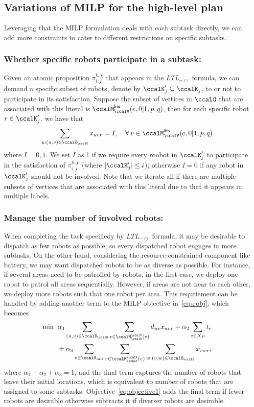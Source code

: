 \documentclass[Afour,sageh,times]{sagej}
\newcommand{\ltl}{ {\it LTL}$_{-\bigcirc}$ }
\renewcommand{\ap}[3]{\mathcal{\pi}_{{#1},{#2}}^{#3}}
\begin{document}
{{\subsection{Variations of MILP for the high-level plan}\label{sec:extension_milp}
Leveraging that the MILP formulation deals with each subtask directly, we can add more constraints to cater to different restrictions on specific subtasks.
\subsubsection{Whether specific robots participate in a subtask:}
Given an atomic proposition $\ap{i}{j}{k,\chi}$ that appears in the \ltl formula, we can demand  a specific subset of robots, denote by  ${\ccalK}'_j \subseteq \ccalK_j$,  to or not to participate in its satisfaction. Suppose the subset of vertices  in $\ccalG$ that are associated with this literal is $\ccalM_{\ccalV}^\mathsf{lits} (e, 0|1, p, q)$,  then for each specific robot $r \in \ccalK'_j$, we have that
\begin{align}
  \sum_{u:(u,v) \in \ccalE_\ccalG} x_{uvr} = I, \quad  \forall \, v \in \ccalM_{\ccalV}^\mathsf{lits} (e, 0|1, p, q)
\end{align}
where $I=0,1$. We set $I$ as 1 if we require every roobot in $\ccalK'_j$ to participate in the satisfaction of $\ap{i}{j}{k,\chi}$ (where $|\ccalK'_j|\leq i$); otherwise $I=0$ if any robot in $\ccalK'_j$ should not be involved. Note that we iterate all if there are multiple subsets of vertices that are associated with this literal due to that it appears in multiple labels.
\subsubsection{Manage the number of involved robots:}
When completing the task specifiedy by \ltl formula, it may be desirable to dispatch as few robots as possible, so  every dispatched robot engages in more subtasks. On the other hand, considering the resource-constrained component like battery,  we may want dispatched robots to be  as diverse as possible. For instance, if several areas need to be patrolled by robots, in the first  case, we deploy one robot to patrol all areas sequentially. However, if areas are not near to each other,  we deploy more robots such that one robot per area. This requriement can be handled by adding another term to the MILP objective in~\eqref{equ:obj}, which becomes
\begin{align}\label{eq:objective1}
\min \; \; &  \alpha_1 \sum_{(u,v)\in \ccalE_\ccalG}  \sum_{r \in \ccalM^\ccalV_{\ccalK}(v)} d_{uv} x_{uvr} +  \alpha_2  \sum_{e\in X_P} t_e  \nonumber \\ & \pm  \alpha_3 \sum_{v\in \ccalV_{\text{init}}} \sum_{r \in \ccalM_{\ccalK}^\ccalV(v)} \sum_{w:(v,w)\in \ccalE_\ccalG} x_{vwr},
\end{align}
where $\alpha_1 + \alpha_2 + \alpha_3=1$, and the final term  captures the number of robots that leave their initial locations, which is equivalent to  number of robots that are assigned to some subtasks. Objective~\eqref{eq:objective1} adds the final term if fewer robots are desirable otherwise subtracts it if diverser robots are desirable.

}}
\end{document}
